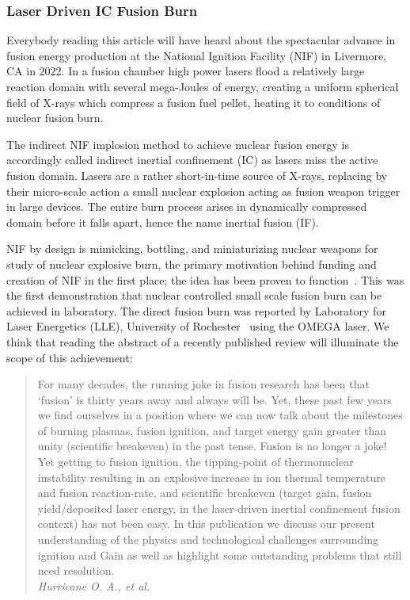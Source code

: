 \documentclass[particles,article,accept,pdftex,moreauthors]{Definitions/mdpi}
\begin{document}
\subsubsection{Laser Driven IC Fusion Burn}\label{sssec:NIF}
Everybody reading this article will have heard about the spectacular advance in fusion energy production at the National Ignition Facility (NIF) in Livermore, CA in 2022. In a fusion chamber high power lasers flood a relatively large reaction domain with several mega-Joules of energy, creating a uniform spherical field of X-rays which compress a fusion fuel pellet, heating it to conditions of nuclear fusion burn.

The indirect NIF implosion method to achieve nuclear fusion energy is accordingly called indirect inertial confinement (IC) as lasers miss the active fusion domain. Lasers are a rather short-in-time source of X-rays, replacing by their micro-scale action a small nuclear explosion acting as fusion weapon trigger in large devices. The entire burn process arises in dynamically compressed domain before it falls apart, hence the name inertial fusion (IF). 

NIF by design is mimicking, bottling, and miniaturizing nuclear weapons for study of nuclear explosive burn, the primary motivation behind funding and creation of NIF in the first place; the idea has been proven to function~\cite{Zylstra:2022burn,Hurricane:2023Review,Hurricane:2025}. This was the first demonstration that nuclear controlled small scale fusion burn can be achieved in laboratory. The direct fusion burn was reported by Laboratory for Laser Energetics (LLE), University of Rochester~\cite{Manion:2022Omega,Gopalaswamy:2024direct} using the OMEGA laser. We think that reading the abstract of a recently published review will illuminate the scope of this achievement:
\begin{quote}
For many decades, the running joke in fusion research has been that `fusion' is thirty years away and always will be. Yet, these past few years we find ourselves in a position where we can now talk about the milestones of burning plasmas, fusion ignition, and target energy gain greater than unity (scientific breakeven) in the past tense. Fusion is no longer a joke! Yet getting to fusion ignition, the tipping-point of thermonuclear instability resulting in an explosive increase in ion thermal temperature and fusion reaction-rate, and scientific breakeven (target gain, fusion yield/deposited laser energy, in the laser-driven inertial confinement fusion context) has not been easy. In this publication we discuss our present understanding of the physics and technological challenges surrounding ignition and Gain as well as highlight some outstanding problems that still need resolution.\\ \emph{Hurricane O. A., et al.}~\cite{Hurricane:2025}
\end{quote}
 
\end{document}
